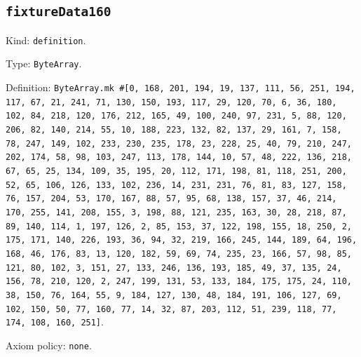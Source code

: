 \documentclass[11pt]{article}
\begin{document}
\subsection*{\texttt{fixtureData160}}
\noindent Kind: \texttt{definition}.\par
\noindent Type: \texttt{ByteArray}.\par
\noindent Definition: \texttt{ByteArray.mk \#[0, 168, 201, 194, 19, 137, 111, 56, 251, 194, 117, 67, 21, 241, 71, 130, 150, 193, 117, 29, 120, 70, 6, 36, 180, 102, 84, 218, 120, 176, 212, 165, 49, 100, 240, 97, 231, 5, 88, 120, 206, 82, 140, 214, 55, 10, 188, 223, 132, 82, 137, 29, 161, 7, 158, 78, 247, 149, 102, 233, 230, 235, 178, 23, 228, 25, 40, 79, 210, 247, 202, 174, 58, 98, 103, 247, 113, 178, 144, 10, 57, 48, 222, 136, 218, 67, 65, 25, 134, 109, 35, 195, 20, 112, 171, 198, 81, 118, 251, 200, 52, 65, 106, 126, 133, 102, 236, 14, 231, 231, 76, 81, 83, 127, 158, 76, 157, 204, 53, 170, 167, 88, 57, 95, 68, 138, 157, 37, 46, 214, 170, 255, 141, 208, 155, 3, 198, 88, 121, 235, 163, 30, 28, 218, 87, 89, 140, 114, 1, 197, 126, 2, 85, 153, 37, 122, 198, 155, 18, 250, 2, 175, 171, 140, 226, 193, 36, 94, 32, 219, 166, 245, 144, 189, 64, 196, 168, 46, 176, 83, 13, 120, 182, 59, 69, 74, 235, 23, 166, 57, 98, 85, 121, 80, 102, 3, 151, 27, 133, 246, 136, 193, 185, 49, 37, 135, 24, 156, 78, 210, 120, 2, 247, 199, 131, 53, 133, 184, 175, 175, 24, 110, 38, 150, 76, 164, 55, 9, 184, 127, 130, 48, 184, 191, 106, 127, 69, 102, 150, 50, 77, 160, 77, 14, 32, 87, 203, 112, 51, 239, 118, 77, 174, 108, 160, 251]}.\par
\noindent Axiom policy: \texttt{none}.\par
\end{document}
